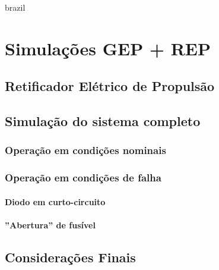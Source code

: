 
%
\cleardoublepage
{}


\begin{otherlanguage*}{brazil}

    \chapter[Simulações]{Simulações GEP + REP}


    \section{Retificador Elétrico de Propulsão}


    \section{Simulação do sistema completo}


    \subsection{Operação em condições nominais}


    \subsection{Operação em condições de falha}


    \subsubsection{Diodo em curto-circuito}


    \subsubsection{''Abertura'' de fusível}


    \section{Considerações Finais}

\end{otherlanguage*}


